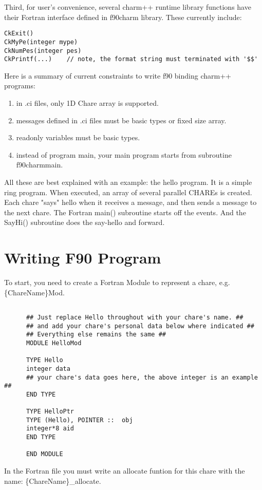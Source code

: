 \documentclass[11pt]{article}
\begin{document}
Third, for user's convenience, several charm++ runtime library functions
have their Fortran interface defined in f90charm library. These currently
include:
\begin{verbatim}
CkExit()
CkMyPe(integer mype)
CkNumPes(integer pes)
CkPrintf(...)    // note, the format string must terminated with '$$'
\end{verbatim}

Here is a summary of current constraints to write f90 binding charm++ programs:
\begin{enumerate}
\item in .ci files, only 1D Chare array is supported.
\item messages defined in .ci files must be basic types or fixed size array.
\item readonly variables must be basic types.
\item instead of program main, your main program starts from subroutine 
f90charmmain.
\end{enumerate}

All these are best explained with an example: the hello program.  It is a
simple ring program.  When executed, an array of several parallel
CHAREs is created.  Each chare "says" hello when it receives a
message, and then sends a message to the next chare.  The Fortran main() 
subroutine starts off the events.  And the SayHi() subroutine does the 
say-hello and forward.

\section{Writing F90 Program}
To start, you need to create a Fortran Module to represent a chare,
e.g. \{ChareName\}Mod.

\begin{verbatim}

      ## Just replace Hello throughout with your chare's name. ##
      ## and add your chare's personal data below where indicated ##
      ## Everything else remains the same ##
      MODULE HelloMod

      TYPE Hello
      integer data
      ## your chare's data goes here, the above integer is an example ##
      END TYPE

      TYPE HelloPtr
      TYPE (Hello), POINTER ::  obj
      integer*8 aid
      END TYPE

      END MODULE
\end{verbatim}

In the Fortran file you must write an allocate funtion for this chare
with the name: \{ChareName\}\_allocate.
\end{document}
